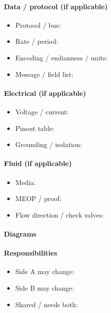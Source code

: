 \paragraph{Data / protocol (if applicable)}
\begin{itemize}
  \item Protocol / bus: \todo{}
  \item Rate / period: \todo{}
  \item Encoding / endianness / units: \todo{}
  \item Message / field list: 
\end{itemize}

\paragraph{Electrical (if applicable)}
\begin{itemize}
  \item Voltage / current: \todo{}
  \item Pinout table: \todo{}
  \item Grounding / isolation: \todo{}
\end{itemize}

\paragraph{Fluid (if applicable)}
\begin{itemize}
  \item Media: \todo{}
  \item MEOP / proof: \todo{}
  \item Flow direction / check valves: \todo{}
\end{itemize}

\paragraph{Diagrams}

\paragraph{Responsibilities}
\begin{itemize}
  \item Side A may change: \todo{}
  \item Side B may change: \todo{}
  \item Shared / needs both: \todo{}
\end{itemize}

